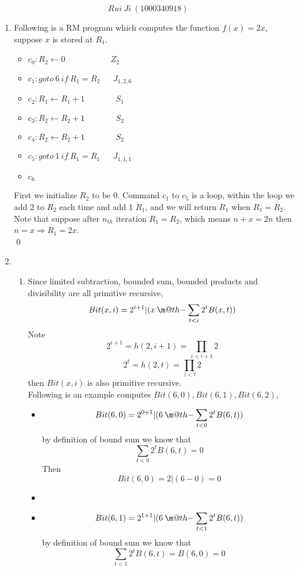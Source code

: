 \documentclass[11pt,twoside]{article}
\makeatletter
\newcommand{\dotminus}{\mathbin{\text{\@dotminus}}}
\newcommand{\@dotminus}{%
  \ooalign{\hidewidth\raise1ex\hbox{.}\hidewidth\cr$\m@th-$\cr}%
}
\makeatother
\begin{document}
\[Rui \ Ji \ (1000340918)\]
\begin{enumerate}[leftmargin=0pt]
\item Following is a RM program which computes the function $f(x) = 2x$, suppose $x$ is stored at $R_1$.
	\begin{itemize}[label = {}]
		\item $c_0: R_2 \leftarrow 0 \ \ \ \ \ \ \ \ \ \ \ \ \ \ \ \ \ \ \ \ \ \ \ \ \ Z_2$
		\item $c_1: goto \ 6 \ if \ R_1 = R_2  \ \ \ \ \ \ \ J_{1,2,6}$
		\item $c_2: R_1 \leftarrow R_1+1  \ \ \ \ \ \ \ \ \ \ \ \ \ \ \ \ \ S_{1}$
		\item $c_3: R_2 \leftarrow R_2+1  \ \ \ \ \ \ \ \ \ \ \ \ \ \ \ \ \  S_{2}$
		\item $c_4: R_2 \leftarrow R_2+1  \ \ \ \ \ \ \ \ \ \ \ \ \ \ \ \ \  S_{2}$
		\item $c_5: goto \ 1 \ if \ R_1 = R_1  \ \ \ \ \ \ \ J_{1,1,1}$
		\item $c_6$
	\end{itemize}
	First we initialize $R_2$ to be $0$. Command $c_1$ to $c_5$ is a loop, within the loop we add $2$ to $R_2$ each time and add $1$ $R_1$, and we will return $R_1$ when $R_1 = R_2$. \\
	Note that suppose after $n_{th}$ iteration $R_1 = R_2$, which means $n+x = 2n$ then $n=x \Rightarrow R_1 = 2x$.\\
	\qed
\item
\begin{enumerate}
\item Since limited subtraction, bounded sum, bounded products  and divisibility are all  primitive recursive,
	\[Bit(x,i) = 2^{i+1} |( x \dotminus \sum_{t<i} 2^t B(x,t))\]
	Note 
	\[2^{i+1} = h(2, i+1) = \prod_{z<i+1}2\]
	\[2^{t} = h(2, t) = \prod_{z<t}2\]
	 then $Bit(x,i)$ is also primitive recursive. \\
	Following is an example computes $Bit(6,0), Bit(6,1), Bit(6,2)$,
	\begin{itemize}[label ={}]
	 \item \[Bit(6,0) = 2^{0+1} |( 6 \dotminus \sum_{t<0} 2^t B(6,t))\]
	  by definition of bound sum we know that 
	  			\[\sum_{t<0} 2^t B(6,t)=0\]
	Then 
				\[Bit(6,0) = 2|(6-0) = 0\]
	\item 
	\item  \[Bit(6,1) = 2^{1+1} |( 6 \dotminus \sum_{t<1} 2^t B(6,t))\]
	 by definition of bound sum we know that 
	  			\[\sum_{t<1} 2^t B(6,t)=B(6,0) = 0\]

\end{itemize}
\end{enumerate}
\end{enumerate}
\end{document}
